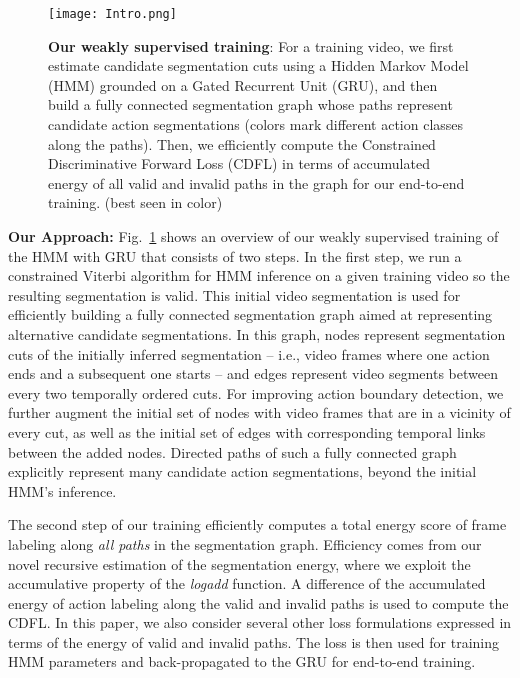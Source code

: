 \documentclass[10pt,twocolumn,letterpaper]{article}
\begin{document}
\begin{figure}[t]
\centering
\texttt{[image: Intro.png]}
\caption{{\bf Our weakly supervised training}: 
For a training video, we first estimate candidate segmentation cuts using a Hidden Markov Model (HMM) grounded on a Gated Recurrent Unit (GRU), and then build a fully connected segmentation graph whose paths represent candidate action segmentations (colors mark different action classes along the paths).  Then, we efficiently compute the Constrained Discriminative Forward Loss (CDFL) in terms of accumulated energy of all valid and invalid paths in the graph for our end-to-end training. (best seen in color)}
\label{fig:Introduction}
\vspace{-4mm}
\end{figure}


{\bf Our Approach:} Fig.~\ref{fig:Introduction} shows an overview of our weakly supervised training of the HMM with GRU that consists of two steps. In the first step, we run a constrained Viterbi algorithm for HMM inference on a given training video so the resulting segmentation is valid. This initial video segmentation is used for efficiently building a fully connected segmentation graph aimed at representing alternative candidate segmentations. In this graph, nodes represent segmentation cuts of the initially inferred segmentation -- i.e., video frames where one action ends and a subsequent one starts -- and edges represent video segments between every two temporally ordered cuts. For improving action boundary detection, we further augment the initial set of nodes with video frames that are in a vicinity of every cut, as well as the initial set of edges with corresponding temporal links between the added nodes. Directed paths of such a fully connected graph explicitly represent many candidate action segmentations, beyond the initial HMM's inference.


The second step of our training efficiently computes a total energy score of frame labeling along {\em all paths} in the segmentation graph. Efficiency comes from our novel recursive estimation of the segmentation energy, where we exploit the accumulative property of the {\em logadd} function. A difference of the accumulated energy of action labeling along the valid and invalid paths is used to compute the CDFL. In this paper, we also consider several other loss formulations expressed in terms of the energy of valid and invalid paths. The loss is then used for training HMM parameters and back-propagated to the GRU for end-to-end training.
\end{document}
